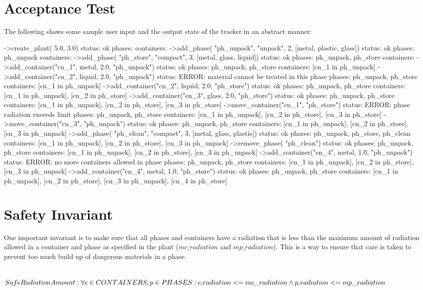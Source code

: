 \documentclass[fontsize=12pt,paper=letter,twoside]{scrartcl}
\begin{document}
\section{Acceptance Test}
The following shows some sample user input and the output state of the tracker in an abstract manner:
\\
\begin{code}
->create_plant( 5.0, 3.0)
status: ok
phases: {}
containers: {}
->add_phase( "ph_unpack", "unpack", 2, [metal, plastic, glass])
status: ok
phases: {ph_unpack}
containers: {}
->add_phase( "ph_store", "compact", 3, [metal, glass, liquid])
status: ok
phases: {ph_unpack, ph_store}
containers: {}
->add_container("cn_1", metal, 2.0, "ph_unpack")
status: ok
phases: {ph_unpack, ph_store}
containers: {[cn_1 in ph_unpack]}
->add_container("cn_2", liquid, 2.0, "ph_unpack")
status: ERROR: material cannot be treated in this phase
phases: {ph_unpack, ph_store}
containers: {[cn_1 in ph_unpack]}
->add_container("cn_2", liquid, 2.0, "ph_store")
status: ok
phases: {ph_unpack, ph_store}
containers: {[cn_1 in ph_unpack], [cn_2 in ph_store]}
->add_container("cn_3", glass, 2.0, "ph_store")
status: ok
phases: {ph_unpack, ph_store}
containers: {[cn_1 in ph_unpack], [cn_2 in ph_store],
                  [cn_3 in ph_store]}
->move_container("cn_1", "ph_store")
status: ERROR:  phase radiation exceeds limit
phases: {ph_unpack, ph_store}
containers: {[cn_1 in ph_unpack], [cn_2 in ph_store], 
	             [cn_3 in ph_store]}
->move_container("cn_3", "ph_unpack")
status: ok
phases: {ph_unpack, ph_store}
containers: {[cn_1 in ph_unpack], [cn_2 in ph_store], 
                  [cn_3 in ph_unpack]}
->add_phase( "ph_clean", "compact", 3, [metal, glass, plastic])
status: ok
phases: {ph_unpack, ph_store, ph_clean}
containers: {[cn_1 in ph_unpack], [cn_2 in ph_store], 
                  [cn_3 in ph_unpack]}
->remove_phase( "ph_clean")
status: ok
phases: {ph_unpack, ph_store}
containers: {[cn_1 in ph_unpack], [cn_2 in ph_store], 
                  [cn_3 in ph_unpack]}
->add_container("cn_4", metal, 1.0, "ph_unpack")
status: ERROR: no more containers allowed in phase
phases: {ph_unpack, ph_store}
containers: {[cn_1 in ph_unpack], [cn_2 in ph_store], 
                  [cn_3 in ph_unpack]}
->add_container("cn_4", metal, 1.0, "ph_store")
status: ok
phases: {ph_unpack, ph_store}
containers: {[cn_1 in ph_unpack], [cn_2 in ph_store], 
                  [cn_3 in ph_unpack], [cn_4 in ph_store]}
\end{code}

\newpage
\section{Safety Invariant}
One important invariant is to make sure that all phases and containers have a radiation that is less than the maximum amount of radiation allowed in a container and phase as specified in the plant ($mc\_radiation$ and $mp\_radiation$). This is a way to ensure that care is taken to prevent too much build up of dangerous materials in a phase. \\ \\

\begin{mdframed}
$SafeRadiationAmount: \forall c \in CONTAINERS, p \in PHASES: \\ c.radiation <= mc\_radiation \land p.radiation <= mp\_radiation$
\end{mdframed}
\end{document}
